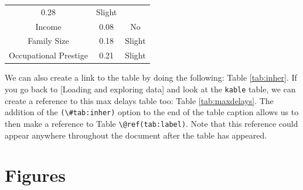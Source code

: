 \documentclass[12pt,twoside]{reedthesis}
\theoremstyle{definition}
\theoremstyle{definition}
\theoremstyle{definition}
\theoremstyle{remark}
\begin{document}
\begin{longtable}[]{@{}ccc@{}}
\begin{minipage}[t]{0.47\columnwidth}
0.28\strut
\end{minipage} & \begin{minipage}[t]{0.16\columnwidth}\centering\strut
Slight\strut
\end{minipage}\tabularnewline
\begin{minipage}[t]{0.29\columnwidth}\centering\strut
Income\strut
\end{minipage} & \begin{minipage}[t]{0.47\columnwidth}\centering\strut
0.08\strut
\end{minipage} & \begin{minipage}[t]{0.16\columnwidth}\centering\strut
No\strut
\end{minipage}\tabularnewline
\begin{minipage}[t]{0.29\columnwidth}\centering\strut
Family Size\strut
\end{minipage} & \begin{minipage}[t]{0.47\columnwidth}\centering\strut
0.18\strut
\end{minipage} & \begin{minipage}[t]{0.16\columnwidth}\centering\strut
Slight\strut
\end{minipage}\tabularnewline
\begin{minipage}[t]{0.29\columnwidth}\centering\strut
Occupational Prestige\strut
\end{minipage} & \begin{minipage}[t]{0.47\columnwidth}\centering\strut
0.21\strut
\end{minipage} & \begin{minipage}[t]{0.16\columnwidth}\centering\strut
Slight\strut
\end{minipage}\tabularnewline
\bottomrule
\end{longtable}
We can also create a link to the table by doing the following: Table
\ref{tab:inher}. If you go back to {[}Loading and exploring data{]} and
look at the \texttt{kable} table, we can create a reference to this max
delays table too: Table \ref{tab:maxdelays}. The addition of the
\texttt{(\textbackslash{}\#tab:inher)} option to the end of the table
caption allows us to then make a reference to Table
\texttt{\textbackslash{}@ref(tab:label)}. Note that this reference could
appear anywhere throughout the document after the table has appeared.

\clearpage

\section{Figures}\label{figures}
\end{document}
